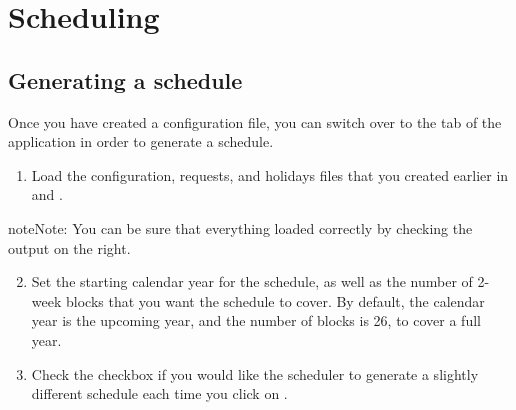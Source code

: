 \documentclass[letterpaper,10pt,english]{sphinxmanual}
\begin{document}
\begin{figure}[H]
\centering
{}\end{figure}


\chapter{Scheduling}
\label{\detokenize{manual:scheduling}}

\section{Generating a schedule}
\label{\detokenize{manual:generating-a-schedule}}\label{\detokenize{manual:id3}}
Once you have created a configuration file, you can switch over to the
 tab of the application in order to generate a schedule.
\begin{enumerate}
\item {} 
Load the configuration, requests, and holidays files that you created
earlier in {\hyperref[\detokenize{manual:clinician-configuration}]{}} and {\hyperref[\detokenize{manual:requests-and-holidays}]{}}.

\end{enumerate}

\begin{sphinxadmonition}{note}{Note:}
You can be sure that everything loaded correctly by checking the output
on the right.
\end{sphinxadmonition}

\begin{figure}[H]
\centering
{}\end{figure}
\begin{enumerate}
\setcounter{enumi}{1}
\item {} 
Set the starting calendar year for the schedule, as well as the number
of 2-week blocks that you want the schedule to cover. By default, the calendar
year is the upcoming year, and the number of blocks is 26, to cover a full
year.

\end{enumerate}

\begin{figure}[H]
\centering
{}\end{figure}
\begin{enumerate}
\setcounter{enumi}{2}
\item {} 
 Check the  checkbox if you would like the scheduler
to generate a slightly different schedule each time you click on .

\end{enumerate}
\end{document}
